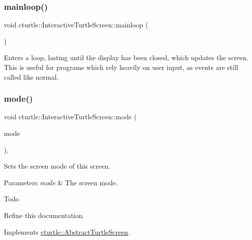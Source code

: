 \subsubsection{\texorpdfstring{mainloop()}{mainloop()}}
{\footnotesize\ttfamily void cturtle\+::\+Interactive\+Turtle\+Screen\+::mainloop (\begin{DoxyParamCaption}{ }\end{DoxyParamCaption})\hspace{0.3cm}{\ttfamily [inline]}}

Enters a loop, lasting until the display has been closed, which updates the screen. This is useful for programs which rely heavily on user input, as events are still called like normal. \mbox{\label{classcturtle_1_1InteractiveTurtleScreen_a1c666afe65211cf9eedaffa17206a697}} 
\subsubsection{\texorpdfstring{mode()}{mode()}\hspace{0.1cm}{\footnotesize\ttfamily [1/2]}}
{\footnotesize\ttfamily void cturtle\+::\+Interactive\+Turtle\+Screen\+::mode (\begin{DoxyParamCaption}\item[{Screen\+Mode}]{mode }\end{DoxyParamCaption})\hspace{0.3cm}{\ttfamily [inline]}, {\ttfamily [virtual]}}

Sets the screen mode of this screen. 
\begin{DoxyParams}{Parameters}
{\em mode} & The screen mode. \\
\hline
\end{DoxyParams}
\begin{DoxyRefDesc}{Todo}
\item[\hyperlink{todo__todo000001}{Todo}]Refine this documentation. \end{DoxyRefDesc}


Implements \hyperlink{classcturtle_1_1AbstractTurtleScreen}{cturtle\+::\+Abstract\+Turtle\+Screen}.

\mbox{\label{classcturtle_1_1InteractiveTurtleScreen_af65c66dbfe93fa748944f7a6d299080e}} 
